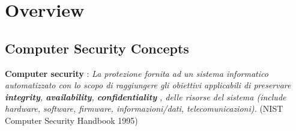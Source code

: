\documentclass[12pt]{article}
\begin{document}
\maketitle
\tableofcontents
\listoftables
\listoffigures
\section{Overview}
	\subsection{Computer Security Concepts}
		\textbf{Computer security }: \textit{ La protezione fornita ad un sistema informatico automatizzato con lo scopo di raggiungere gli obiettivi applicabili di preservare \textbf{integrity}, \textbf{availability}, \textbf{confidentiality} , delle risorse del sistema (include hardware, software, firmware, informazioni/dati, telecomunicazioni).}  (NIST Computer Security Handbook 1995)\\
\end{document}
